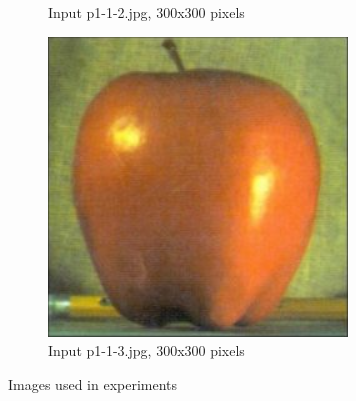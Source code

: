 \begin{figure}[h!]
\begin{subfigure}{0.5\textwidth}
  \caption{Input p1-1-2.jpg, 300x300 pixels}
\end{subfigure}%
\begin{subfigure}{0.5\textwidth}
  \centering
  \includegraphics[width=0.5\linewidth]{input/p1-1-3.png}
  \caption{Input p1-1-3.jpg, 300x300 pixels}
\end{subfigure}
 \caption{Images used in experiments}
\label{fig:Input-images}
\end{figure}


